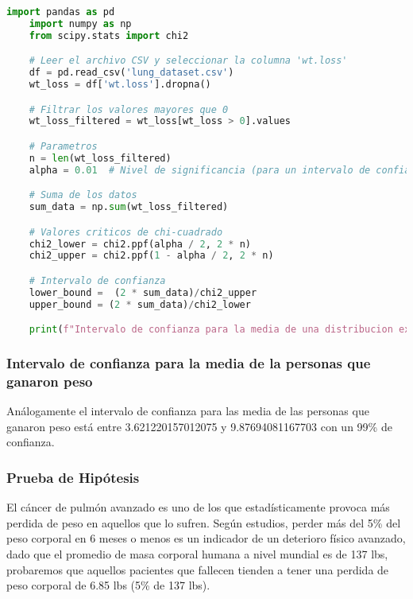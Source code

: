 \documentclass[a4paper,12pt]{article}
\begin{document}
\begin{lstlisting}[language=Python, caption={Código en Python para calcular el intervalo de confianza para la media de una distribución exponencial}, label={lst:intervalo_confianza_exponencial}]
    import pandas as pd
    import numpy as np
    from scipy.stats import chi2

    # Leer el archivo CSV y seleccionar la columna 'wt.loss'
    df = pd.read_csv('lung_dataset.csv')
    wt_loss = df['wt.loss'].dropna()

    # Filtrar los valores mayores que 0
    wt_loss_filtered = wt_loss[wt_loss > 0].values

    # Parametros
    n = len(wt_loss_filtered)
    alpha = 0.01  # Nivel de significancia (para un intervalo de confianza del 99%)

    # Suma de los datos
    sum_data = np.sum(wt_loss_filtered)

    # Valores criticos de chi-cuadrado
    chi2_lower = chi2.ppf(alpha / 2, 2 * n)
    chi2_upper = chi2.ppf(1 - alpha / 2, 2 * n)

    # Intervalo de confianza
    lower_bound =  (2 * sum_data)/chi2_upper 
    upper_bound = (2 * sum_data)/chi2_lower

    print(f"Intervalo de confianza para la media de una distribucion exponencial: ({lower_bound}, {upper_bound})")

\end{lstlisting}

\subsubsection*{Intervalo de confianza para la media de la personas que ganaron peso}

Análogamente el intervalo de confianza para las media de las personas que ganaron peso está entre 3.621220157012075 y 9.87694081167703 con un 99\% de confianza.

\subsubsection*{Prueba de Hipótesis}

El cáncer de pulmón avanzado es uno de los que estadísticamente provoca más perdida de peso en aquellos que lo sufren. Según estudios, perder más del 5\% del peso corporal en 6 meses o menos es un indicador de un deterioro físico avanzado, dado que el promedio de masa corporal humana a nivel mundial es de 137 lbs, probaremos que aquellos pacientes que fallecen tienden a tener una perdida de peso corporal de 6.85 lbs (5\% de 137 lbs).
\end{document}
